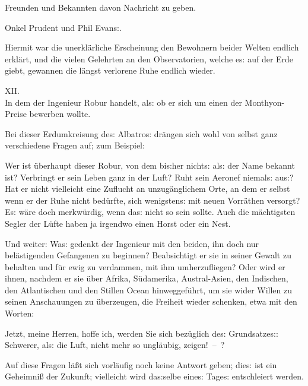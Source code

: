 \documentclass[oneside,12pt]{book}
\newenvironment{antiqua}{\normalfont}{}
\newcommand{\s}{s:}
\begin{document}
Freunden und Bekannten davon Nachricht zu geben.

\hfill Onkel Prudent und Phil Evan{\s}.{\grqq}
\bigskip

Hiermit war die unerkl\"arliche Erscheinung den Bewohnern beider
Welten endlich erkl\"art, und die vielen Gelehrten an den Observatorien,
welche e{\s} auf der Erde giebt, gewannen die l\"angst verlorene Ruhe
endlich wieder.



\newpage\begin{center}\label{kap12}
{\large \begin{antiqua}XII.\end{antiqua}\\
In dem der Ingenieur Robur handelt, al{\s} ob er sich um einen der
Monthyon-Preise bewerben wollte.\\\bigskip}
\end{center}



Bei dieser Erdumkreisung de{\s} {\glqq}Albatro{\s}{\grqq} dr\"angen
sich wohl von selbst ganz verschiedene Fragen auf; zum Beispiel:

Wer ist \"uberhaupt dieser Robur, von dem bi{\s}her nicht{\s} al{\s}
der Name bekannt ist? Verbringt er sein Leben ganz in der Luft? Ruht
sein Aeronef niemal{\s} au{\s}? Hat er nicht vielleicht eine Zuflucht
an unzug\"anglichem Orte, an dem er selbst wenn er der Ruhe nicht
bed\"urfte, sich wenigsten{\s} mit neuen Vorr\"athen versorgt? E{\s}
w\"are doch merkw\"urdig, wenn da{\s} nicht so sein sollte. Auch die
m\"achtigsten Segler der L\"ufte haben ja irgendwo einen Horst oder
ein Nest.

Und weiter: Wa{\s} gedenkt der Ingenieur mit den beiden, ihn doch nur
bel\"astigenden Gefangenen zu beginnen? Beabsichtigt er sie in seiner
Gewalt zu behalten und f\"ur ewig zu verdammen, mit ihm umherzufliegen?
Oder wird er ihnen, nachdem er sie \"uber Afrika, S\"udamerika,
Austral-Asien, den Indischen, den Atlantischen und den Stillen Ocean
hinweggef\"uhrt, um sie wider Willen zu seinen Anschauungen zu
\"uberzeugen, die Freiheit wieder schenken, etwa mit den Worten:

{\glqq}Jetzt, meine Herren, hoffe ich, werden Sie sich bez\"uglich
de{\s} Grundsatze{\s}: {\glqq}Schwerer, al{\s} die Luft{\grqq}, nicht
mehr so ungl\"aubig, zeigen!~--~?{\grqq}

Auf diese Fragen l\"a{\ss}t sich vorl\"aufig noch keine Antwort
geben; die{\s} ist ein Geheimni{\ss} der Zukunft; vielleicht wird
da{\s}selbe eine{\s} Tage{\s} entschleiert werden.
\end{document}
